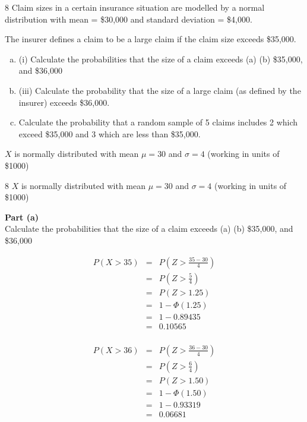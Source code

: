 \documentclass[a4paper,12pt]{article}
\begin{document}
8
Claim sizes in a certain insurance situation are modelled by a normal distribution with
mean \mu = \$30,000 and standard deviation \sigma = \$4,000.

 The insurer defines a claim to
be a large claim if the claim size exceeds \$35,000.
\begin{enumerate}[(a)]
\item (i)
Calculate the probabilities that the size of a claim exceeds
(a)
(b)
\$35,000, and
\$36,000

\item 
(iii)
Calculate the probability that the size of a large claim (as defined by the
insurer) exceeds \$36,000.
\item 
Calculate the probability that a random sample of 5 claims includes 2 which
exceed \$35,000 and 3 which are less than \$35,000.
\end{enumerate}


$X$ is normally distributed with mean $\mu = 30$ and $\sigma = 4$ (working in units of \$1000)

\newpage
8
$X$ is normally distributed with mean $\mu = 30$ and $\sigma = 4$ (working in units of \$1000)

\begin{framed}
\noindent \textbf{Part (a)}\\ \large
\noindent Calculate the probabilities that the size of a claim exceeds
(a)
(b)
\$35,000, and
\$36,000


\end{framed}
\large
\noindent 
\begin{eqnarray*}
P ( X > 35 ) &=& P \left( Z >\frac{35 − 30}{4} \right) \\
&=& P \left( Z >\frac{5}{4} \right) \\
&=& P ( Z > 1.25 ) \\ 
&=& 1 - \Phi (1.25 ) \\ 
&=& 1 − 0.89435 \\
&=& 0.10565\\
\end{eqnarray*}
 

\begin{eqnarray*}
P ( X > 36 ) &=& P \left( Z >\frac{36 − 30}{4} \right) \\
&=& P \left( Z >\frac{6}{4} \right) \\
&=& P ( Z > 1.50 ) \\ 
&=& 1 - \Phi (1.50) \\ 
&=& 1 − 0.93319 \\
&=& 0.06681\\
\end{eqnarray*}
\newpage
\end{document}
